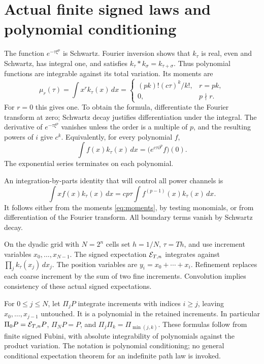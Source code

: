 \documentclass[11pt]{article}
\theoremstyle{remark}\newtheorem{remark}[theorem]{Remark}
\begin{document}
\section{Actual finite signed laws and polynomial conditioning}
The function $e^{-\tau\xi^p}$ is Schwartz. Fourier inversion shows
that $k_\tau$ is real, even and Schwartz, has integral one, and
satisfies $k_\tau*k_\sigma=k_{\tau+\sigma}$. Thus polynomial
functions are integrable against its total variation. Its moments
are
\begin{equation}\label{eq:moments}
 \mu_r(\tau)=\int x^r k_\tau(x)\,dx
 =\begin{cases}(pk)!(c\tau)^k/k!,&r=pk,\\0,&p\nmid r.
 \end{cases}
\end{equation}
For $r=0$ this gives one. To obtain the formula, differentiate the
Fourier transform at zero; Schwartz decay justifies differentiation
under the integral. The derivative of $e^{-\tau\xi^p}$ vanishes
unless the order is a multiple of $p$, and the resulting powers
of $i$ give $c^k$. Equivalently, for every polynomial $f$,
\begin{equation}\label{eq:heat}
 \int f(x)k_\tau(x)\,dx
 =\big(e^{c\tau\partial^p}f\big)(0).
\end{equation}
The exponential series terminates on each polynomial.

An integration-by-parts identity that will control all power
channels is
\begin{equation}\label{eq:stein}
 \int xf(x)k_\tau(x)\,dx
 =cp\tau\int f^{(p-1)}(x)k_\tau(x)\,dx.
\end{equation}
It follows either from the moments \eqref{eq:moments}, by testing
monomials, or from differentiation of the Fourier transform.
All boundary terms vanish by Schwartz decay.

On the dyadic grid with $N=2^n$ cells set $h=1/N$, $\tau=Th$,
and use increment variables $x_0,\ldots,x_{N-1}$. The signed
expectation $\mathcal E_{T,n}$ integrates against
$\prod_j k_\tau(x_j)\,dx_j$. The position variables are
$y_i=x_0+\cdots+x_i$. Refinement replaces each coarse increment
by the sum of two fine increments. Convolution implies consistency
of these actual signed expectations.

For $0\leq j\leq N$, let $\Pi_jP$ integrate increments with
indices $i\geq j$, leaving $x_0,\ldots,x_{j-1}$ untouched.
It is a polynomial in the retained increments. In particular
$\Pi_0P=\mathcal E_{T,n}P$, $\Pi_NP=P$, and $\Pi_j\Pi_k=\Pi_{\min(j,k)}$.
These formulas follow from finite signed Fubini, with absolute
integrability of polynomials against the product variation.
The notation is polynomial conditioning; no general conditional
expectation theorem for an indefinite path law is invoked.
\end{document}
